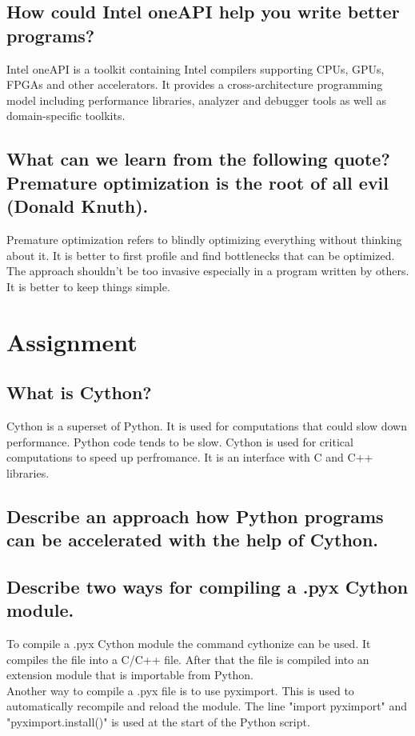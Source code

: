 \documentclass[runningheads]{llncs}
\begin{document}
\subsection{How could Intel oneAPI help you write better programs?}
Intel oneAPI is a toolkit containing Intel compilers supporting CPUs, GPUs, FPGAs and other accelerators.
It provides a cross-architecture programming model including performance libraries, analyzer and debugger tools as well as 
domain-specific toolkits.

\subsection{What can we learn from the following quote? Premature optimization is the root of all evil (Donald Knuth).}
Premature optimization refers to blindly optimizing everything without thinking about it.
It is better to first profile and find bottlenecks that can be optimized.
The approach shouldn't be too invasive especially in a program written by others.
It is better to keep things simple.

\section{Assignment}

\subsection{What is Cython?}
Cython is a superset of Python. 
It is used for computations that could slow down performance.
Python code tends to be slow. 
Cython is used for critical computations to speed up perfromance.
It is an interface with C and C++ libraries.

\subsection{Describe an approach how Python programs can be accelerated with the help of Cython.}

\subsection{Describe two ways for compiling a .pyx Cython module.}
To compile a .pyx Cython module the command cythonize can be used. 
It compiles the file into a C/C++ file.
After that the file is compiled into an extension module that is importable from Python.
\\
Another way to compile a .pyx file is to use pyximport. 
This is used to automatically recompile and reload the module.
The line "import pyximport" and "pyximport.install()" is used at the start of the Python script.
\end{document}
